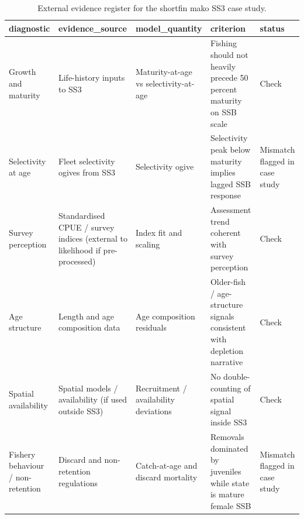 \begin{table}

\caption{\label{tab:external-evidence}External evidence register for the shortfin mako SS3 case study.}
\centering
\begin{tabular}[t]{lllll}
\toprule
diagnostic & evidence\_source & model\_quantity & criterion & status\\
\midrule
Growth and maturity & Life-history inputs to SS3 & Maturity-at-age vs selectivity-at-age & Fishing should not heavily precede 50 percent maturity on SSB scale & Check\\
Selectivity at age & Fleet selectivity ogives from SS3 & Selectivity ogive & Selectivity peak below maturity implies lagged SSB response & Mismatch flagged in case study\\
Survey perception & Standardised CPUE / survey indices (external to likelihood if pre-processed) & Index fit and scaling & Assessment trend coherent with survey perception & Check\\
Age structure & Length and age composition data & Age composition residuals & Older-fish / age-structure signals consistent with depletion narrative & Check\\
Spatial availability & Spatial models / availability (if used outside SS3) & Recruitment / availability deviations & No double-counting of spatial signal inside SS3 & Check\\
\addlinespace
Fishery behaviour / non-retention & Discard and non-retention regulations & Catch-at-age and discard mortality & Removals dominated by juveniles while state is mature female SSB & Mismatch flagged in case study\\
\bottomrule
\end{tabular}
\end{table}

